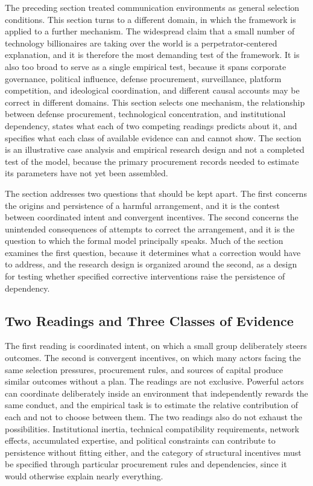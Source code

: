 \documentclass[12pt]{article}
\theoremstyle{remark}
\begin{document}
The preceding section treated communication environments as general selection conditions. This section turns to a different domain, in which the framework is applied to a further mechanism. The widespread claim that a small number of technology billionaires are taking over the world is a perpetrator-centered explanation, and it is therefore the most demanding test of the framework. It is also too broad to serve as a single empirical test, because it spans corporate governance, political influence, defense procurement, surveillance, platform competition, and ideological coordination, and different causal accounts may be correct in different domains. This section selects one mechanism, the relationship between defense procurement, technological concentration, and institutional dependency, states what each of two competing readings predicts about it, and specifies what each class of available evidence can and cannot show. The section is an illustrative case analysis and empirical research design and not a completed test of the model, because the primary procurement records needed to estimate its parameters have not yet been assembled.

The section addresses two questions that should be kept apart. The first concerns the origins and persistence of a harmful arrangement, and it is the contest between coordinated intent and convergent incentives. The second concerns the unintended consequences of attempts to correct the arrangement, and it is the question to which the formal model principally speaks. Much of the section examines the first question, because it determines what a correction would have to address, and the research design is organized around the second, as a design for testing whether specified corrective interventions raise the persistence of dependency.

\subsection{Two Readings and Three Classes of Evidence}

The first reading is coordinated intent, on which a small group deliberately steers outcomes. The second is convergent incentives, on which many actors facing the same selection pressures, procurement rules, and sources of capital produce similar outcomes without a plan. The readings are not exclusive. Powerful actors can coordinate deliberately inside an environment that independently rewards the same conduct, and the empirical task is to estimate the relative contribution of each and not to choose between them. The two readings also do not exhaust the possibilities. Institutional inertia, technical compatibility requirements, network effects, accumulated expertise, and political constraints can contribute to persistence without fitting either, and the category of structural incentives must be specified through particular procurement rules and dependencies, since it would otherwise explain nearly everything.
\end{document}
